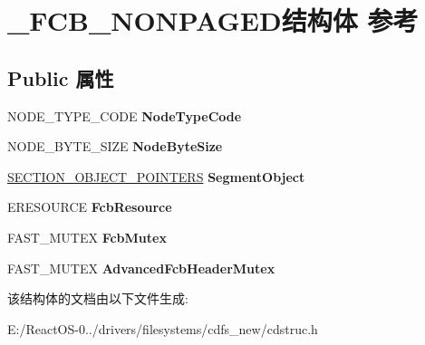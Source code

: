 \hypertarget{struct___f_c_b___n_o_n_p_a_g_e_d}{}\section{\+\_\+\+F\+C\+B\+\_\+\+N\+O\+N\+P\+A\+G\+E\+D结构体 参考}
\label{struct___f_c_b___n_o_n_p_a_g_e_d}
\subsection*{Public 属性}
\begin{DoxyCompactItemize}
\item 
\mbox{\label{struct___f_c_b___n_o_n_p_a_g_e_d_abb7982ecfa965734e11e1d60f9097b9d}} 
N\+O\+D\+E\+\_\+\+T\+Y\+P\+E\+\_\+\+C\+O\+DE {\bfseries Node\+Type\+Code}
\item 
\mbox{\label{struct___f_c_b___n_o_n_p_a_g_e_d_adff1860ba3a6b001a0f704ea30eac169}} 
N\+O\+D\+E\+\_\+\+B\+Y\+T\+E\+\_\+\+S\+I\+ZE {\bfseries Node\+Byte\+Size}
\item 
\mbox{\label{struct___f_c_b___n_o_n_p_a_g_e_d_ab4490b7296f33c06198c5b9eb1e6a65b}} 
\hyperlink{struct___s_e_c_t_i_o_n___o_b_j_e_c_t___p_o_i_n_t_e_r_s}{S\+E\+C\+T\+I\+O\+N\+\_\+\+O\+B\+J\+E\+C\+T\+\_\+\+P\+O\+I\+N\+T\+E\+RS} {\bfseries Segment\+Object}
\item 
\mbox{\label{struct___f_c_b___n_o_n_p_a_g_e_d_a0dec70a2e22ac636baf90375f2beee4f}} 
E\+R\+E\+S\+O\+U\+R\+CE {\bfseries Fcb\+Resource}
\item 
\mbox{\label{struct___f_c_b___n_o_n_p_a_g_e_d_ab385bc11f3821f219293d8177c1ac98c}} 
F\+A\+S\+T\+\_\+\+M\+U\+T\+EX {\bfseries Fcb\+Mutex}
\item 
\mbox{\label{struct___f_c_b___n_o_n_p_a_g_e_d_a5c9df46aaa01168c981dd0c9e871608f}} 
F\+A\+S\+T\+\_\+\+M\+U\+T\+EX {\bfseries Advanced\+Fcb\+Header\+Mutex}
\end{DoxyCompactItemize}


该结构体的文档由以下文件生成\+:\begin{DoxyCompactItemize}
\item 
E\+:/\+React\+O\+S-\/0../drivers/filesystems/cdfs\+\_\+new/cdstruc.\+h\end{DoxyCompactItemize}
